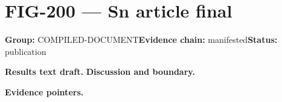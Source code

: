 \clearpage
\section{FIG-200 --- Sn article final}
\label{figpage:fig-200}
\textbf{Group:} COMPILED-DOCUMENT\quad \textbf{Evidence chain:} manifested\quad \textbf{Status:} publication

\textbf{Results text draft.} 
\textbf{Discussion and boundary.} 


\textbf{Evidence pointers.}



\vfill
